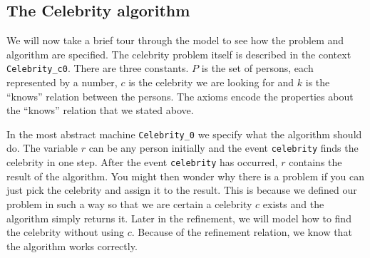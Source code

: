{\begin{description}
\begin{description}
		\AnyPrm
			\begin{description}
			\end{description}
		\WhereGrd
			\begin{description}
			\nItemX{ grd1 }{ x \in  R }
			\nItemX{ grd2 }{ x \mapsto  b \notin  k }
			\end{description}
		\Witnesses
			\begin{description}
			\nItem{ y }{ b=y }
			\end{description}
		\ThenAct
			\begin{description}
			\nItemX{ act2 }{ b :=  x }
			\nItemX{ act1 }{ R :=  R \setminus  \{ x\}  }
			\end{description}
		\EndAct
		\end{description}
\END
\end{description}
}
\subsection{The Celebrity algorithm}
\label{the_celebrity_algorithm}

We will now take a brief tour through the model to see how the problem and algorithm are specified.
The celebrity problem itself is described in the context \texttt{Celebrity\_c0}. There are
  three constants. $P$ is the set of persons, each represented by a number, $c$ is the celebrity
  we are looking for and $k$ is the ``knows'' relation between the persons.
The axioms encode the properties about the ``knows'' relation that we stated above.


In the most abstract machine \texttt{Celebrity\_0} we specify what the algorithm should do.
The variable $r$ can be any person initially and the event \texttt{celebrity} 
  finds the celebrity in one step. 
After the event \texttt{celebrity} has occurred, $r$ contains the result of the algorithm.
You might then wonder why there is a problem if you can just pick the celebrity and assign it to the result. This is because we defined our problem in such a way so that we are certain a celebrity $c$ exists and the algorithm simply returns it.
Later in the refinement, we will model how to find the celebrity without using $c$.
Because of the refinement relation, we know that the algorithm works correctly.

